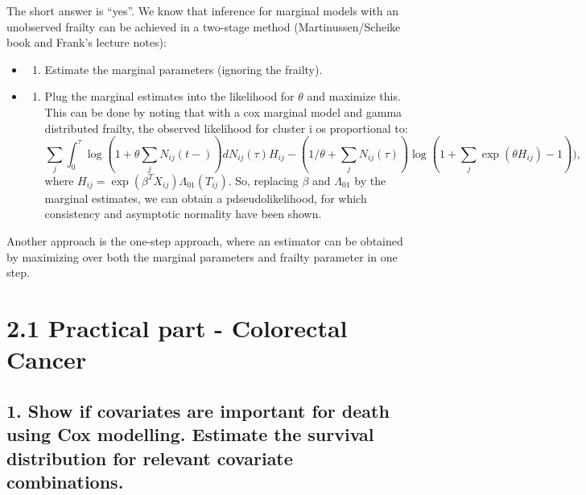 \documentclass[
  11pt,
]{article}
\providecommand{\tightlist}{%
  \setlength{\itemsep}{0pt}\setlength{\parskip}{0pt}}
\begin{document}
The short answer is ``yes''. We know that inference for marginal models
with an unobserved frailty can be achieved in a two-stage method
(Martinussen/Scheike book and Frank's lecture notes):

\begin{itemize}
\item
  \begin{enumerate}
  \def\labelenumi{\arabic{enumi})}
  \tightlist
  \item
    Estimate the marginal parameters (ignoring the frailty).
  \end{enumerate}
\item
  \begin{enumerate}
  \def\labelenumi{\arabic{enumi})}
  \setcounter{enumi}{1}
  \tightlist
  \item
    Plug the marginal estimates into the likelihood for \(\theta\) and
    maximize this. This can be done by noting that with a cox marginal
    model and gamma distributed frailty, the observed likelihood for
    cluster i os proportional to: \[
    \sum_j \int_0^\tau \log(1+\theta \sum_j N_{ij}(t-))dN_{ij}(\tau)H_{ij}-(1/\theta+\sum_j N_{ij}(\tau)) \log(1+\sum_j \exp(\theta H_{ij})-1)), 
    \] where \(H_{ij}=\exp(\beta^TX_{ij})\Lambda_{01}(T_{ij})\). So,
    replacing \(\beta\) and \(\Lambda_{01}\) by the marginal estimates,
    we can obtain a pdseudolikelihood, for which consistency and
    asymptotic normality have been shown.
  \end{enumerate}
\end{itemize}

Another approach is the one-step approach, where an estimator can be
obtained by maximizing over both the marginal parameters and frailty
parameter in one step.

\hypertarget{practical-part---colorectal-cancer}{%
\section{2.1 Practical part - Colorectal
Cancer}\label{practical-part---colorectal-cancer}}

\hypertarget{show-if-covariates-are-important-for-death-using-cox-modelling.-estimate-the-survival-distribution-for-relevant-covariate-combinations.}{%
\subsection{1. Show if covariates are important for death using Cox
modelling. Estimate the survival distribution for relevant covariate
combinations.}\label{show-if-covariates-are-important-for-death-using-cox-modelling.-estimate-the-survival-distribution-for-relevant-covariate-combinations.}}
\end{document}
